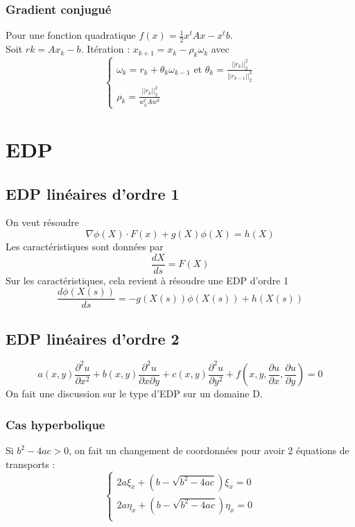 \documentclass[12pt]{report}
\begin{document}
\subsection{Gradient conjugu\'e}
Pour une fonction quadratique $f(x)=\frac{1}{2} x^t A x - x^t b$.\\
Soit $r k=Ax_k-b$.
It\'eration : $x_{k+1}=x_k-\rho_k \omega_k$ avec 
\begin{equation*}
\left\{
\begin{array}{l}
\omega_k =r_k+\theta_k \omega_{k-1} \text{ et }
\theta_k=\frac{||r_k||_2^2}{||r_{k-1}||_2^2}\\
\rho_k =\frac{||r_k||_2^2}{w_k^t A w^k}
\end{array}
\right.
\end{equation*}

\chapter{EDP}
\section{EDP lin\'eaires d'ordre 1}
On veut r\'esoudre
$$\nabla \phi(X)\cdot F(x)+g(X)\phi(X) = h(X)$$
Les caract\'eristiques sont donn\'ees par 
$$ \frac{dX}{ds}=F(X)$$
Sur les caract\'eristiques, cela revient \`a r\'esoudre une EDP d'ordre 1
$$ \frac{d \phi(X(s))}{ds}=-g(X(s)) \phi(X(s)) + h(X(s))$$

\section{EDP lin\'eaires d'ordre 2}
$$ a(x,y) \frac{\partial^2 u}{\partial x^2}+
b(x,y) \frac{\partial^2 u}{\partial x \partial y}+
c(x,y) \frac{\partial^2 u}{\partial y^2}+
f(x,y,\frac{\partial u}{\partial x}, \frac{\partial u}{\partial y})=0$$
On fait une discussion sur le type d'EDP sur un domaine D.
\subsection{Cas hyperbolique}
Si $b^2-4ac > 0$, on fait un changement de coordonn\'ees pour avoir 2 \'equations de
transports :
\begin{equation*}
\left\{
\begin{array}{l}
2a \xi_x+(b-\sqrt{b^2-4ac}) \xi_x = 0\\
2a \eta_x+(b-\sqrt{b^2-4ac}) \eta_x = 0\\
\end{array}
\right.
\end{equation*}
\end{document}
